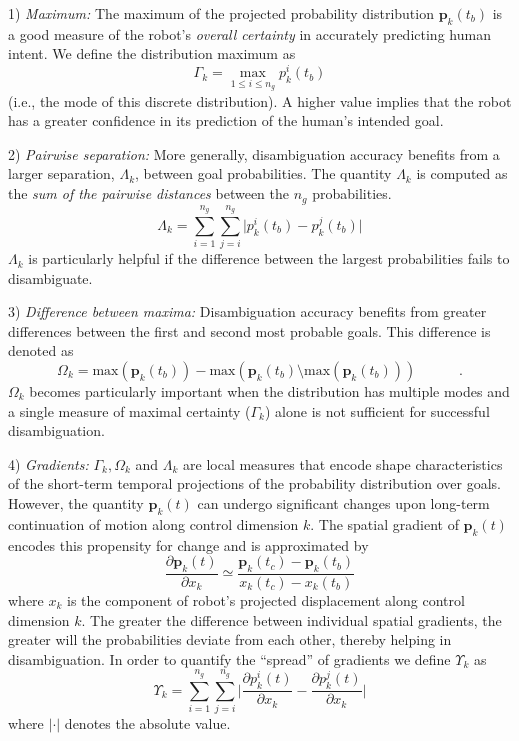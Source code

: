 \documentclass[journal]{IEEEtran}
\begin{document}
1) \textit{Maximum:} The maximum of the projected probability distribution $\boldsymbol{p}_k(t_b)$ is a good measure of the robot's \textit{overall certainty} in accurately predicting human intent. We define the distribution maximum as
\begin{equation}
\Gamma_k = \max\limits_{1 \leq i \leq n_g}p^i_k(t_b)
\end{equation}
(i.e., the mode of this discrete distribution).
A higher value implies that the robot has a greater confidence in its prediction of the human's intended goal.

2) \textit{Pairwise separation:} More generally, disambiguation accuracy benefits from a larger separation, $\Lambda_k$, between goal probabilities. The quantity $\Lambda_k$ is computed as the \textit{sum of the pairwise distances} between the $n_g$ probabilities.
\begin{equation}
\Lambda_k = \sum_{i=1}^{n_g}\sum_{j=i}^{n_g}\lvert p^i_k(t_b) - p^j_k(t_b)\rvert
\end{equation}
$\Lambda_k$ is particularly helpful if the difference between the largest probabilities fails to disambiguate.

3) \textit{Difference between maxima:} Disambiguation accuracy benefits from greater differences between the first and second most probable goals. This difference is denoted as
\begin{equation}
\Omega_k = \text{max}(\boldsymbol{p}_k(t_b)) - \text{max}(\boldsymbol{p}_k(t_b) \setminus \text{max}(\boldsymbol{p}_k(t_b))) \;\;\;\;\;\;\;\;\;\;\;.
\end{equation}
$\Omega_k$ becomes particularly important when the distribution has multiple modes and a single measure of maximal certainty ($\Gamma_k$) alone is not sufficient for successful disambiguation. 

4) \textit{Gradients:} $\Gamma_k, \Omega_k$ and $\Lambda_k$ are local measures that encode shape characteristics of the short-term temporal projections of the probability distribution over goals. However, the quantity $\boldsymbol{p}_k(t)$ can undergo significant changes upon long-term continuation of motion along control dimension $k$. The spatial gradient of $\boldsymbol{p}_k(t)$ encodes this propensity for change and is approximated by 
\begin{equation*}
\frac{\partial\boldsymbol{p}_k(t)}{\partial x_k} \simeq \frac{\boldsymbol{p}_k(t_c) - \boldsymbol{p}_k(t_b)}{x_k(t_c) - x_k(t_b)}
\end{equation*}
where $x_k$ is the component of robot's projected displacement along control dimension $k$. The greater the difference between individual spatial gradients, the greater will the probabilities deviate from each other, thereby helping in disambiguation. In order to quantify the ``spread'' of gradients we define $\Upsilon_k$ as
\begin{equation}
\Upsilon_k = \sum_{i=1}^{n_g}\sum_{j=i}^{n_g}\Big \lvert\frac{\partial p^i_k(t)}{\partial x_k} - \frac{\partial p^j_k(t)}{\partial x_k}\Big \rvert
\end{equation}
where $\lvert\cdot\rvert$ denotes the absolute value. 
\end{document}
